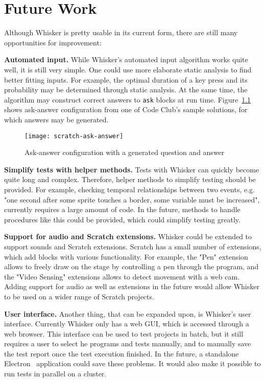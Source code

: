 
\chapter{Future Work}

Although Whisker is pretty usable in its current form,
there are still many opportunities for improvement:
\parspace

\textbf{Automated input.}
While Whisker's automated input algorithm works quite well, it is still very simple.
One could use more elaborate static analysis to find better fitting inputs.
For example, the optimal duration of a key press and its probability may be determined through static analysis.
At the same time, the algorithm may construct correct answers to \texttt{ask} blocks at run time.
Figure~\ref{fig:generated_ask_answer} shows ask-answer configuration from one of Code Club's sample solutions,
for which answers may be generated.

\begin{figure}[htpb]
    \centering
    \texttt{[image: scratch-ask-answer]}
    \caption{Ask-answer configuration with a generated question and answer}
    \label{fig:generated_ask_answer}
\end{figure}

\textbf{Simplify tests with helper methods.}
Tests with Whisker can quickly become quite long and complex.
Therefore, helper methods to simplify testing should be provided.
For example, checking temporal relationships between two events,
e.g. "one second after some sprite touches a border, some variable must be increased",
currently requires a large amount of code.
In the future, methods to handle procedures like this could be provided,
which could simplify testing greatly.
\parspace

\textbf{Support for audio and Scratch extensions.}
Whisker could be extended to support sounds and Scratch extensions.
Scratch has a small number of extensions, which add blocks with various functionality.
For example, the "Pen" extension allows to freely draw on the stage by controlling a pen through the program,
and the "Video Sensing" extensions allows to detect movement with a web cam.
Adding support for audio as well as extensions in the future would allow Whisker to be used on a wider range of Scratch projects.
\parspace

\textbf{User interface.}
Another thing, that can be expanded upon, is Whisker's user interface.
Currently Whisker only has a web GUI, which is accessed through a web browser.
This interface can be used to test projects in batch, but it still requires a user to select he programs and tests manually,
and to manually save the test report once the test execution finished.
In the future, a standalone Electron~\cite{electron} application could save these problems.
It would also make it possible to run tests in parallel on a cluster.
